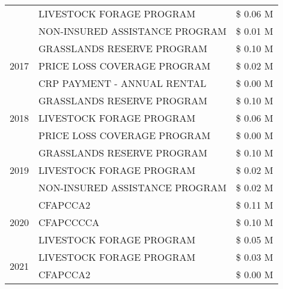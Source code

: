 \begin{tabular}{llr}
 & LIVESTOCK FORAGE PROGRAM & \$ 0.06 M \\
 & NON-INSURED ASSISTANCE PROGRAM & \$ 0.01 M \\
\cline{1-3}
\multirow[t]{3}{*}{2017} & GRASSLANDS RESERVE PROGRAM & \$ 0.10 M \\
 & PRICE LOSS COVERAGE PROGRAM & \$ 0.02 M \\
 & CRP PAYMENT - ANNUAL RENTAL & \$ 0.00 M \\
\cline{1-3}
\multirow[t]{3}{*}{2018} & GRASSLANDS RESERVE PROGRAM & \$ 0.10 M \\
 & LIVESTOCK FORAGE PROGRAM & \$ 0.06 M \\
 & PRICE LOSS COVERAGE PROGRAM & \$ 0.00 M \\
\cline{1-3}
\multirow[t]{3}{*}{2019} & GRASSLANDS RESERVE PROGRAM & \$ 0.10 M \\
 & LIVESTOCK FORAGE PROGRAM & \$ 0.02 M \\
 & NON-INSURED ASSISTANCE PROGRAM & \$ 0.02 M \\
\cline{1-3}
\multirow[t]{3}{*}{2020} & CFAPCCA2 & \$ 0.11 M \\
 & CFAPCCCCA & \$ 0.10 M \\
 & LIVESTOCK FORAGE PROGRAM & \$ 0.05 M \\
\cline{1-3}
\multirow[t]{2}{*}{2021} & LIVESTOCK FORAGE PROGRAM & \$ 0.03 M \\
 & CFAPCCA2 & \$ 0.00 M \\
\cline{1-3}
\bottomrule
\end{tabular}
